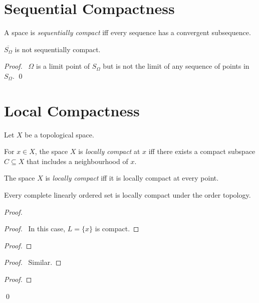 \section{Sequential Compactness}

\begin{df}
  A space is \emph{sequentially compact} iff every sequence has a convergent
  subsequence.
\end{df}

 \begin{prop}
 $\overline{S_\Omega}$ is not sequentially compact.
\end{prop}

\begin{proof}
\pf\ $\Omega$ is a limit point of $S_\Omega$ but is not the limit of any
sequence of points in $S_\Omega$. \qed
\end{proof}

\section{Local Compactness}

\begin{df}
  Let $X$ be a topological space.

  For $x \in X$, the space $X$ is \emph{locally compact} at $x$ iff there
  exists a compact subspace $C \subseteq X$ that includes a neighbourhood of
  $x$.

  The space $X$ is \emph{locally compact} iff it is locally compact at every
  point.
\end{df}

 \begin{prop}
Every complete linearly ordered set is locally compact under the order
topology.
\end{prop}

\begin{proof}
\pf
{}
\begin{proof}
\pf\ In this case, $L = \{ x \}$ is compact.
\end{proof}
\begin{proof}
\step{<2>2}{Take $C = [a,x]$ and $U = (a, x]$}
\end{proof}
\begin{proof}
  \pf\ Similar.
\end{proof}
\begin{proof}
\end{proof}
\qed
\end{proof}

